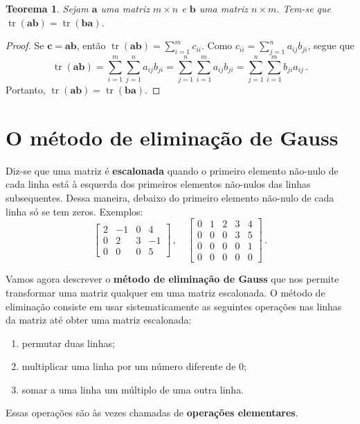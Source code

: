 \documentclass[12pt,a4paper]{report}
\newcommand{\tb}{\textbf}
\newcommand{\mb}{\mathbf}
\newtheorem{thm}{Teorema}[chapter]
\DeclareMathOperator{\tr}{tr}
\begin{document}
\begin{thm}
  Sejam $\mb a$ uma matriz $m\times n$ e $\mb b$ uma matriz $n\times m$. Tem-se que $\tr(\mb {ab})=\tr(\mb{ba})$.
\end{thm}
\begin{proof}
  Se $\mb c=\mb a\mb b$, então $\tr(\mb {ab})=\sum_{i=1}^m c_{ii}$. Como $c_{ii}=\sum_{j=1}^na_{ij}b_{ji}$, segue que
  $$\tr(\mb{ab})=\sum_{i=1}^m\sum_{j=1}^na_{ij}b_{ji}=\sum_{j=1}^n\sum_{i=1}^ma_{ij}b_{ji}=\sum_{j=1}^n\sum_{i=1}^mb_{ji}a_{ij}\,.$$
  Portanto, $\tr(\mb{ab})=\tr(\mb{ba})$.
\end{proof}

\chapter{O método de eliminação de Gauss}

Diz-se que uma matriz é \tb{escalonada} quando o primeiro elemento não-nulo de cada linha está à esquerda dos primeiros elementos não-nulos das linhas subsequentes. Dessa maneira, debaixo do primeiro elemento não-nulo de cada linha só se tem zeros. Exemplos:
$$\begin{bmatrix}
  2&-1&0&4\\
  0&2&3&-1\\
  0&0&0&5
\end{bmatrix}\,,\quad \begin{bmatrix}
  0&1&2&3&4\\
  0&0&0&3&5\\
  0&0&0&0&1\\
  0&0&0&0&0
\end{bmatrix}\,.$$

Vamos agora descrever o \tb{método de eliminação de Gauss} que nos permite transformar uma matriz qualquer em uma matriz escalonada. O método de eliminação consiste em usar sistematicamente as seguintes operações nas linhas da matriz até obter uma matriz escalonada:
\begin{enumerate}
  \item permutar duas linhas;
  \item multiplicar uma linha por um número diferente de $0$;
  \item somar a uma linha um múltiplo de uma outra linha.
\end{enumerate}
Essas operações são às vezes chamadas de \tb{operações elementares}.
\end{document}
